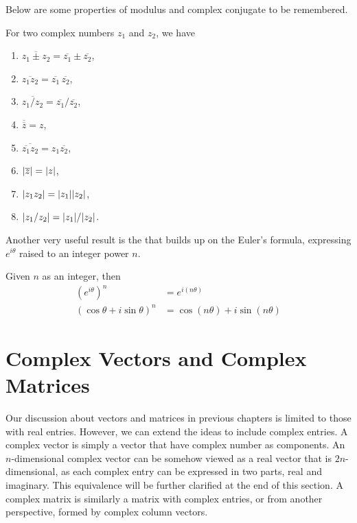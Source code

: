 Below are some properties of modulus and complex conjugate to be remembered.
\begin{proper}
\label{proper:complexnum}
For two complex numbers $z_1$ and $z_2$, we have
\begin{enumerate}[label=(\alph*)]
\item $\overline{z_1 \pm z_2} = \overline{z_1} \pm \overline{z_2}$, 
\item $\overline{z_1z_2} = \overline{z_1}\,\overline{z_2}$,
\item $\overline{z_1/z_2} = \overline{z_1}/\overline{z_2}$,
\item $\overline{\overline{z}} = z$,
\item $\overline{\overline{z_1}z_2} = z_1\overline{z_2}$,
\item $\abs{\overline{z}} = \abs{z}$,
\item $\abs{z_1z_2} = \abs{z_1}\abs{z_2}$,
\item $\abs{z_1/z_2} = \abs{z_1}/\abs{z_2}$.
\end{enumerate}
\end{proper}
Another very useful result is the  that builds up on the Euler's formula, expressing $e^{i \theta}$ raised to an integer power $n$.
\begin{thm}
Given $n$ as an integer, then
\begin{subequations}
\begin{align}
(e^{i \theta})^n &= e^{i (n\theta)} \\
(\cos\theta + i \sin\theta)^n &= \cos(n\theta) + i \sin(n\theta)
\end{align}
\end{subequations}
\end{thm}

\section{Complex Vectors and Complex Matrices}

Our discussion about vectors and matrices in previous chapters is limited to those with real entries. However, we can extend the ideas to include complex entries. A complex vector is simply a vector that have complex number as components. An $n$-dimensional complex vector can be somehow viewed as a real vector that is $2n$-dimensional, as each complex entry can be expressed in two parts, real and imaginary. This equivalence will be further clarified at the end of this section. A complex matrix is similarly a matrix with complex entries, or from another perspective, formed by complex column vectors.

